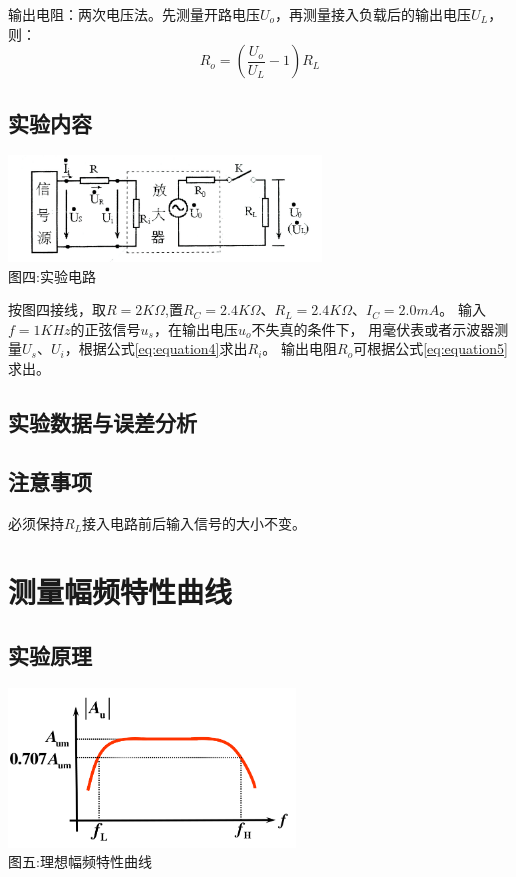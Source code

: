 \documentclass[a4paper]{article}
\begin{document}
    {{输出电阻：两次电压法。先测量开路电压$U_o$，再测量接入负载后的输出电压$U_L$，则：}}
    \begin{equation}
        R_o=(\frac{U_o}{U_L}-1)R_L\label{eq:equation5}
    \end{equation}

    \subsection{实验内容}\label{subsec:10}
    \begin{center}
        \includegraphics[height=80pt]{R}\\
        {\small 图四:实验电路}
    \end{center}
    {{按图四接线，取$R=2K\Omega$,置$R_C=2.4K\Omega$、$R_L=2.4K\Omega$、$I_C=2.0mA$。
    输入$f=1KHz$的正弦信号$u_s$，在输出电压$u_o$不失真的条件下，
    用毫伏表或者示波器测量$U_s$、$U_i$，根据公式\ref{eq:equation4}求出$R_i$。}}
    {{输出电阻$R_o$可根据公式\ref{eq:equation5}求出。}}

    \subsection{实验数据与误差分析}\label{subsec:11}

    \subsection{注意事项}\label{subsec:12}
    {{必须保持$R_L$接入电路前后输入信号的大小不变。}}

    \vspace{1cm}


    \section{测量幅频特性曲线}\label{sec:6}

    \subsection{实验原理}\label{subsec:13}
    \begin{center}
        \includegraphics[height=120pt]{Af}\\
        {\small 图五:理想幅频特性曲线}
    \end{center}
\end{document}

